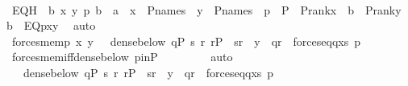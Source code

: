 \begin{isabellebody}
\isanewline
\ \ \ \ \isamarkupfalse%
\ \isamarkupfalse%
\ EQH\ {\isacharcolon}{\kern0pt}\ {\isachardoublequoteopen}{\isasymAnd}b\ x\ y\ p{\isachardot}{\kern0pt}\ b\ {\isasymin}\ a\ {\isasymLongrightarrow}\ x\ {\isasymin}\ P{\isacharunderscore}{\kern0pt}names\ {\isasymLongrightarrow}\ y\ {\isasymin}\ P{\isacharunderscore}{\kern0pt}names\ {\isasymLongrightarrow}\ p\ {\isasymin}\ P\ {\isasymLongrightarrow}\ P{\isacharunderscore}{\kern0pt}rank{\isacharparenleft}{\kern0pt}x{\isacharparenright}{\kern0pt}\ {\isasymle}\ b\ {\isasymLongrightarrow}\ P{\isacharunderscore}{\kern0pt}rank{\isacharparenleft}{\kern0pt}y{\isacharparenright}{\kern0pt}\ {\isasymle}\ b\ {\isasymLongrightarrow}\ EQ{\isacharparenleft}{\kern0pt}p{\isacharcomma}{\kern0pt}x{\isacharcomma}{\kern0pt}y{\isacharparenright}{\kern0pt}{\isachardoublequoteclose}\ \isamarkupfalse%
\ auto\ \ \isanewline
\isanewline
\ \ \ \ \isamarkupfalse%
\ {\isachardoublequoteopen}forces{\isacharunderscore}{\kern0pt}mem{\isacharparenleft}{\kern0pt}p{\isacharcomma}{\kern0pt}\ x{\isacharcomma}{\kern0pt}\ y{\isacharparenright}{\kern0pt}\ {\isasymlongleftrightarrow}\ \ dense{\isacharunderscore}{\kern0pt}below{\isacharparenleft}{\kern0pt}{\isacharbraceleft}{\kern0pt}\ q{\isasymin}P{\isachardot}{\kern0pt}\ {\isasymexists}s{\isachardot}{\kern0pt}\ {\isasymexists}r{\isachardot}{\kern0pt}\ r{\isasymin}P\ {\isasymand}\ {\isasymlangle}s{\isacharcomma}{\kern0pt}r{\isasymrangle}\ {\isasymin}\ y\ {\isasymand}\ q{\isasympreceq}r\ {\isasymand}\ forces{\isacharunderscore}{\kern0pt}eq{\isacharparenleft}{\kern0pt}q{\isacharcomma}{\kern0pt}x{\isacharcomma}{\kern0pt}s{\isacharparenright}{\kern0pt}{\isacharbraceright}{\kern0pt}{\isacharcomma}{\kern0pt}\ p{\isacharparenright}{\kern0pt}{\isachardoublequoteclose}\isanewline
\ \ \ \ \ \ \isamarkupfalse%
\ forces{\isacharunderscore}{\kern0pt}mem{\isacharunderscore}{\kern0pt}iff{\isacharunderscore}{\kern0pt}dense{\isacharunderscore}{\kern0pt}below\ pinP\ \isanewline
\ \ \ \ \ \ \isamarkupfalse%
\ auto\ \isanewline
\ \ \ \ \ \ \isamarkupfalse%
\ \isanewline
\ \ \ \ \isamarkupfalse%
\ \isamarkupfalse%
\ {\isachardoublequoteopen}{\isachardot}{\kern0pt}{\isachardot}{\kern0pt}{\isachardot}{\kern0pt}\ {\isasymlongleftrightarrow}\ dense{\isacharunderscore}{\kern0pt}below{\isacharparenleft}{\kern0pt}{\isasympi}{\isacharbackquote}{\kern0pt}{\isacharbackquote}{\kern0pt}{\isacharbraceleft}{\kern0pt}\ q{\isasymin}P{\isachardot}{\kern0pt}\ {\isasymexists}s{\isachardot}{\kern0pt}\ {\isasymexists}r{\isachardot}{\kern0pt}\ r{\isasymin}P\ {\isasymand}\ {\isasymlangle}s{\isacharcomma}{\kern0pt}r{\isasymrangle}\ {\isasymin}\ y\ {\isasymand}\ q{\isasympreceq}r\ {\isasymand}\ forces{\isacharunderscore}{\kern0pt}eq{\isacharparenleft}{\kern0pt}q{\isacharcomma}{\kern0pt}x{\isacharcomma}{\kern0pt}s{\isacharparenright}{\kern0pt}{\isacharbraceright}{\kern0pt}{\isacharcomma}{\kern0pt}\ {\isasympi}{\isacharbackquote}{\kern0pt}p{\isacharparenright}{\kern0pt}{\isachardoublequoteclose}\ \isanewline

\end{isabellebody}
